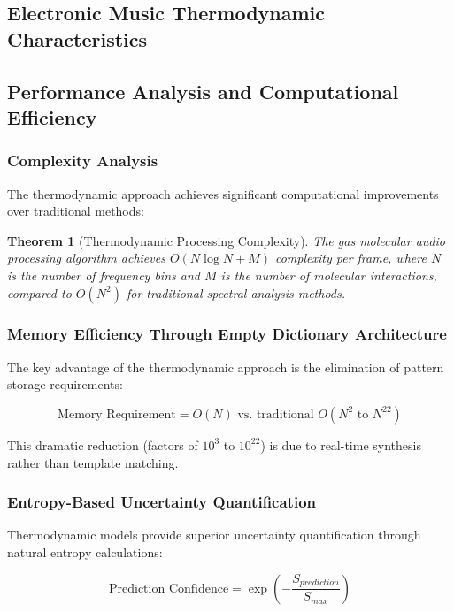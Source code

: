 \documentclass[12pt,a4paper]{article}
\newtheorem{theorem}{Theorem}
\begin{document}
\subsection{Electronic Music Thermodynamic Characteristics}

\subsection{Performance Analysis and Computational Efficiency}

\subsubsection{Complexity Analysis}

The thermodynamic approach achieves significant computational improvements over traditional methods:

\begin{theorem}[Thermodynamic Processing Complexity]
The gas molecular audio processing algorithm achieves $O(N \log N + M)$ complexity per frame, where $N$ is the number of frequency bins and $M$ is the number of molecular interactions, compared to $O(N^2)$ for traditional spectral analysis methods.
\end{theorem}

\subsubsection{Memory Efficiency Through Empty Dictionary Architecture}

The key advantage of the thermodynamic approach is the elimination of pattern storage requirements:

\begin{equation}
\text{Memory Requirement} = O(N) \text{ vs. traditional } O(N^2 \text{ to } N^{22})
\end{equation}

This dramatic reduction (factors of $10^3$ to $10^{22}$) is due to real-time synthesis rather than template matching.

\subsubsection{Entropy-Based Uncertainty Quantification}

Thermodynamic models provide superior uncertainty quantification through natural entropy calculations:

\begin{equation}
\text{Prediction Confidence} = \exp\left(-\frac{S_{prediction}}{S_{max}}\right)
\end{equation}
\end{document}
